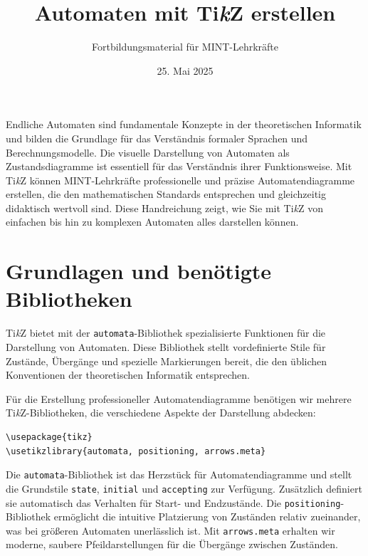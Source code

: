 



\title{Automaten mit Ti\textit{k}Z erstellen}
\author{Fortbildungsmaterial für MINT-Lehrkräfte}
\date{25. Mai 2025}
\pagestyle{plain}



\maketitle

Endliche Automaten sind fundamentale Konzepte in der theoretischen Informatik und bilden die Grundlage für das Verständnis formaler Sprachen und Berechnungsmodelle. Die visuelle Darstellung von Automaten als Zustandsdiagramme ist essentiell für das Verständnis ihrer Funktionsweise. Mit Ti\textit{k}Z können MINT-Lehrkräfte professionelle und präzise Automatendiagramme erstellen, die den mathematischen Standards entsprechen und gleichzeitig didaktisch wertvoll sind. Diese Handreichung zeigt, wie Sie mit Ti\textit{k}Z von einfachen bis hin zu komplexen Automaten alles darstellen können.



\section{Grundlagen und benötigte Bibliotheken}

Ti\textit{k}Z bietet mit der \texttt{automata}-Bibliothek spezialisierte Funktionen für die Darstellung von Automaten. Diese Bibliothek stellt vordefinierte Stile für Zustände, Übergänge und spezielle Markierungen bereit, die den üblichen Konventionen der theoretischen Informatik entsprechen.

Für die Erstellung professioneller Automatendiagramme benötigen wir mehrere Ti\textit{k}Z-Bibliotheken, die verschiedene Aspekte der Darstellung abdecken:

\begin{lstlisting}[style=latex]
\usepackage{tikz}
\usetikzlibrary{automata, positioning, arrows.meta}
\end{lstlisting}

Die \texttt{automata}-Bibliothek ist das Herzstück für Automatendiagramme und stellt die Grundstile \texttt{state}, \texttt{initial} und \texttt{accepting} zur Verfügung. Zusätzlich definiert sie automatisch das Verhalten für Start- und Endzustände. Die \texttt{positioning}-Bibliothek ermöglicht die intuitive Platzierung von Zuständen relativ zueinander, was bei größeren Automaten unerlässlich ist. Mit \texttt{arrows.meta} erhalten wir moderne, saubere Pfeildarstellungen für die Übergänge zwischen Zuständen.

